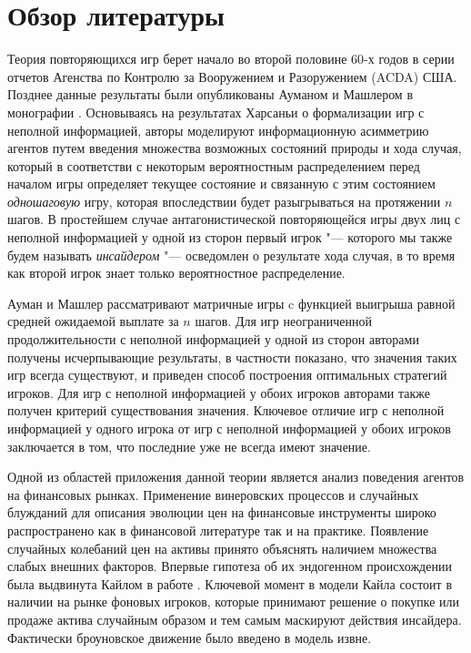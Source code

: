 \chapter*{Обзор литературы}

Теория повторяющихся игр берет начало во второй половине 60-х годов в серии
отчетов \cite{r:aumann66, r:aumann67, r:aumann68a, r:aumann68b, r:stearns67}
Агенства по Контролю за Вооружением и Разоружением (ACDA) США. Позднее данные
результаты были опубликованы Ауманом и Машлером в монографии \cite{aumann95}.
Основываясь на результатах Харсаньи \cite{harsanyi67} о формализации игр с
неполной информацией, авторы моделируют информационную асимметрию агентов путем
введения множества возможных состояний природы и хода случая, который в
соответстви с некоторым вероятностным распределением перед началом игры
определяет текущее состояние и связанную с этим состоянием \emph{одношаговую}
игру, которая впоследствии будет разыгрываться на протяжении $n$ шагов. В
простейшем случае антагонистической повторяющейся игры двух лиц с неполной
информацией у одной из сторон первый игрок "--- которого мы также будем называть
\emph{инсайдером} "--- осведомлен о результате хода случая, в то время как
второй игрок знает только вероятностное распределение.

Ауман и Машлер рассматривают матричные игры c функцией выигрыша равной средней
ожидаемой выплате за $n$ шагов. Для игр неограниченной продолжительности с
неполной информацией у одной из сторон авторами получены исчерпывающие
результаты, в частности показано, что значения таких игр всегда существуют, и
приведен способ построения оптимальных стратегий игроков. Для игр с неполной
информацией у обоих игроков авторами также получен критерий существования
значения. Ключевое отличие игр с неполной информацией у одного игрока от игр с
неполной информацией у обоих игроков заключается в том, что последние уже не
всегда имеют значение.


Одной из областей приложения данной теории является анализ поведения агентов на
финансовых рынках. Применение винеровских процессов и случайных блужданий для
описания эволюции цен на финансовые инструменты широко распространено как в
финансовой литературе так и на практике. Появление случайных колебаний цен на
активы принято объяснять наличием множества слабых внешних факторов. Впервые
гипотеза об их эндогенном происхождении была выдвинута Кайлом в работе
\cite{kyle85}. Ключевой момент в модели Кайла состоит в наличии на рынке фоновых
игроков, которые принимают решение о покупке или продаже актива случайным
образом и тем самым маскируют действия инсайдера. Фактически броуновское
движение было введено в модель извне.

